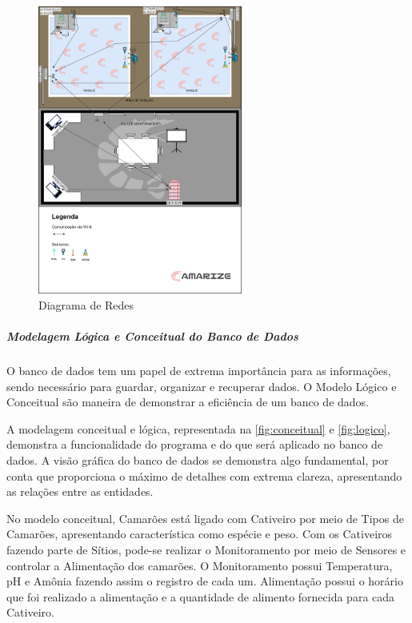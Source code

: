 \begin{figure}[!htb]
\centering
{}
\caption{Diagrama de Redes}%
\label{fig:redes}
\includegraphics[width = 0.6\textwidth]{Imagens/Diagrama de Redes.png}
\end{figure}

\newpage

\subparagraph*{\textbf{Modelagem Lógica e Conceitual do Banco de Dados}}

O banco de dados tem um papel de extrema importância para as informações, sendo necessário para guardar, organizar e recuperar dados. O Modelo Lógico e Conceitual são maneira de demonstrar a eficiência de um banco de dados.

A modelagem conceitual e lógica, representada na \cref{fig:conceitual} e \cref{fig:logico}, demonstra a funcionalidade do programa e do que será aplicado no banco de dados. A visão gráfica do banco de dados se demonstra algo fundamental, por conta que proporciona o máximo de detalhes com extrema clareza, apresentando as relações entre as entidades.

No modelo conceitual, Camarões está ligado com Cativeiro por meio de Tipos de Camarões, apresentando característica como espécie e peso. Com os Cativeiros fazendo parte de Sítios, pode-se realizar o Monitoramento por meio de Sensores e controlar a Alimentação dos camarões. O Monitoramento possui Temperatura, pH e Amônia fazendo assim o registro de cada um. Alimentação possui o horário que foi realizado a alimentação e a quantidade de alimento fornecida para cada Cativeiro.

